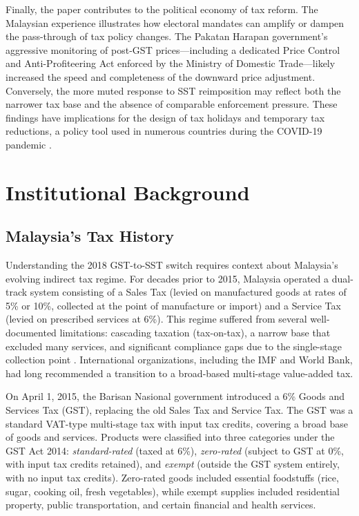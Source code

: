 \documentclass[12pt]{article}
\begin{document}
Finally, the paper contributes to the political economy of tax reform. The Malaysian experience illustrates how electoral mandates can amplify or dampen the pass-through of tax policy changes. The Pakatan Harapan government's aggressive monitoring of post-GST prices---including a dedicated Price Control and Anti-Profiteering Act enforced by the Ministry of Domestic Trade---likely increased the speed and completeness of the downward price adjustment. Conversely, the more muted response to SST reimposition may reflect both the narrower tax base and the absence of comparable enforcement pressure. These findings have implications for the design of tax holidays and temporary tax reductions, a policy tool used in numerous countries during the COVID-19 pandemic \citep{crossley2021}.

\section{Institutional Background}

\subsection{Malaysia's Tax History}

Understanding the 2018 GST-to-SST switch requires context about Malaysia's evolving indirect tax regime. For decades prior to 2015, Malaysia operated a dual-track system consisting of a Sales Tax (levied on manufactured goods at rates of 5\% or 10\%, collected at the point of manufacture or import) and a Service Tax (levied on prescribed services at 6\%). This regime suffered from several well-documented limitations: cascading taxation (tax-on-tax), a narrow base that excluded many services, and significant compliance gaps due to the single-stage collection point \citep{leow2019, saari2023}. International organizations, including the IMF and World Bank, had long recommended a transition to a broad-based multi-stage value-added tax.

On April 1, 2015, the Barisan Nasional government introduced a 6\% Goods and Services Tax (GST), replacing the old Sales Tax and Service Tax. The GST was a standard VAT-type multi-stage tax with input tax credits, covering a broad base of goods and services. Products were classified into three categories under the GST Act 2014: \emph{standard-rated} (taxed at 6\%), \emph{zero-rated} (subject to GST at 0\%, with input tax credits retained), and \emph{exempt} (outside the GST system entirely, with no input tax credits). Zero-rated goods included essential foodstuffs (rice, sugar, cooking oil, fresh vegetables), while exempt supplies included residential property, public transportation, and certain financial and health services.
\end{document}

